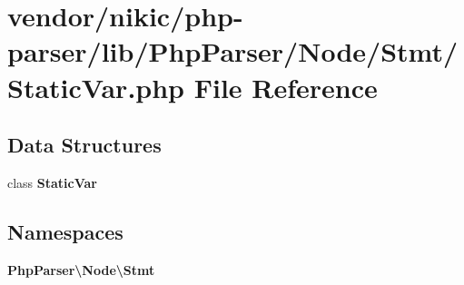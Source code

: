 \section{vendor/nikic/php-\/parser/lib/\+Php\+Parser/\+Node/\+Stmt/\+Static\+Var.php File Reference}
\label{_static_var_8php}
\subsection*{Data Structures}
\begin{DoxyCompactItemize}
\item 
class {\bf Static\+Var}
\end{DoxyCompactItemize}
\subsection*{Namespaces}
\begin{DoxyCompactItemize}
\item 
 {\bf Php\+Parser\textbackslash{}\+Node\textbackslash{}\+Stmt}
\end{DoxyCompactItemize}
